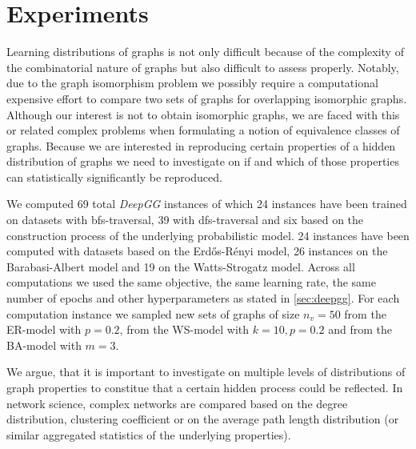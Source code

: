 \documentclass{article}
\begin{document}
 \section{Experiments}\label{sec:experiments}
Learning distributions of graphs is not only difficult because of the complexity of the combinatorial nature of graphs but also difficult to assess properly.
Notably, due to the graph isomorphism problem we possibly require a computational expensive effort to compare two sets of graphs for overlapping isomorphic graphs.
Although our interest is not to obtain isomorphic graphs, we are faced with this or related complex problems when formulating a notion of equivalence classes of graphs.
Because we are interested in reproducing certain properties of a hidden distribution of graphs we need to investigate on if and which of those properties can statistically significantly be reproduced.

We computed 69 total \textit{DeepGG} instances of which 24 instances have been trained on datasets with bfs-traversal, 39 with dfs-traversal and six based on the construction process of the underlying probabilistic model.
24 instances have been computed with datasets based on the Erdős-Rényi model, 26 instances on the Barabasi-Albert model and 19 on the Watts-Strogatz model.
Across all computations we used the same objective, the same learning rate, the same number of epochs and other hyperparameters as stated in \autoref{sec:deepgg}.
For each computation instance we sampled new sets of graphs of size $n_v = 50$ from the ER-model with $p = 0.2$, from the WS-model with $k = 10, p = 0.2$ and from the BA-model with $m = 3$.

We argue, that it is important to investigate on multiple levels of distributions of graph properties to constitue that a certain hidden process could be reflected.
In network science, complex networks are compared based on the degree distribution, clustering coefficient \cite{watts1998collective} or on the average path length distribution (or similar aggregated statistics of the underlying properties).
\end{document}
